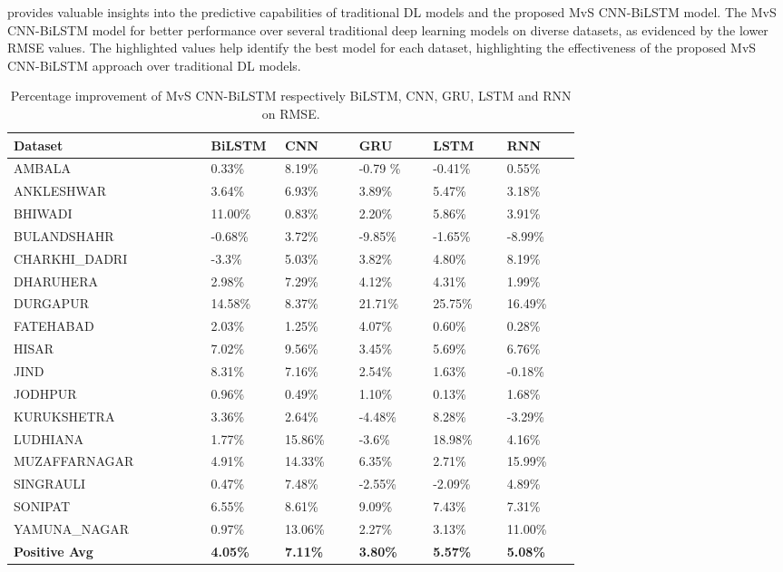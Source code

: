    provides valuable insights into the predictive capabilities of traditional DL models and the proposed MvS CNN-BiLSTM model. The MvS CNN-BiLSTM model for better performance over several traditional deep learning models on diverse datasets,  as evidenced by the lower RMSE values. The highlighted values help identify the best model for each dataset,  highlighting the effectiveness of the proposed MvS CNN-BiLSTM approach over traditional DL models.
    \begin{table}[H]
        \setlength{\tabcolsep}{3pt}
        {\renewcommand{\arraystretch}{1}%
        \begin{longtable}[c]{ p{0.32\linewidth} p{0.12\linewidth} p{0.12\linewidth} p{0.12\linewidth}  p{0.12\linewidth} p{0.12\linewidth}}%
        \caption{Percentage improvement of MvS CNN-BiLSTM respectively BiLSTM,  CNN,  GRU,  LSTM and RNN on RMSE.}
        \label{RMSE imp}
        \\ \hline
        Dataset        &   BiLSTM &   CNN &   GRU &   LSTM &   RNN 
        \\ \hline
        \endhead
        AMBALA & 0.33\% & 8.19\% & -0.79 \% & -0.41\% & 0.55\% \\
        ANKLESHWAR & 3.64\% & 6.93\% & 3.89\% & 5.47\% & 3.18\% \\
        BHIWADI & 11.00\% & 0.83\% & 2.20\% & 5.86\% & 3.91\% \\
        BULANDSHAHR & -0.68\% & 3.72\% & -9.85\% & -1.65\% & -8.99\% \\
        CHARKHI\_DADRI &-3.3\% & 5.03\% & 3.82\% & 4.80\% & 8.19\% \\
        DHARUHERA & 2.98\% & 7.29\% & 4.12\% & 4.31\% & 1.99\% \\
        DURGAPUR & 14.58\% & 8.37\% & 21.71\% & 25.75\% & 16.49\% \\
        FATEHABAD & 2.03\% & 1.25\% & 4.07\% & 0.60\% & 0.28\% \\
        HISAR & 7.02\% & 9.56\% & 3.45\% & 5.69\% & 6.76\% \\
        JIND & 8.31\% & 7.16\% & 2.54\% & 1.63\% & -0.18\% \\
        JODHPUR & 0.96\% & 0.49\% & 1.10\% & 0.13\% & 1.68\% \\
        KURUKSHETRA & 3.36\% & 2.64\% & -4.48\% & 8.28\% & -3.29\% \\
        LUDHIANA & 1.77\% & 15.86\% & -3.6\% & 18.98\% & 4.16\% \\
        MUZAFFARNAGAR & 4.91\% & 14.33\% & 6.35\% & 2.71\% & 15.99\% \\
        SINGRAULI & 0.47\% & 7.48\% & -2.55\% & -2.09\% & 4.89\% \\
        SONIPAT & 6.55\% & 8.61\% & 9.09\% & 7.43\% & 7.31\% \\
        YAMUNA\_NAGAR & 0.97\% & 13.06\% & 2.27\% & 3.13\% & 11.00\% \\ \hline
        \textbf{Positive Avg}  & \textbf{4.05\%} & \textbf{7.11\%}& \textbf{3.80\%} & \textbf{5.57\%} & \textbf{5.08\%} \\ \hline
        \end{longtable}}
        
        \end{table}



